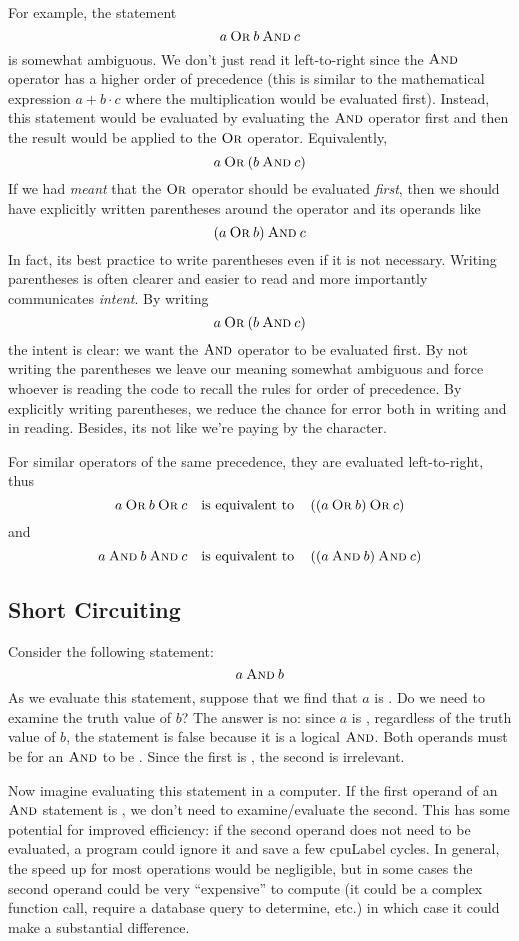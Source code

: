 For example, the statement
  $$a \mathbin{\textsc{Or}} b \mathbin{\textsc{And}} c$$
is somewhat ambiguous.  We don't just read it left-to-right since the $\mathbin{\textsc{And}}$ 
operator has a higher order of precedence (this is similar to the mathematical
expression $a + b \cdot c$ where the multiplication would be evaluated first).  
Instead, this statement would be evaluated by evaluating the $\mathbin{\textsc{And}}$ operator
first and then the result would be applied to the $\mathbin{\textsc{Or}}$ operator.  Equivalently, 
  $$a \mathbin{\textsc{Or}} (b \mathbin{\textsc{And}} c)$$
If we had \emph{meant} that the $\mathbin{\textsc{Or}}$ operator should be evaluated \emph{first}, 
then we should have explicitly written parentheses around the operator and
its operands like
  $$(a \mathbin{\textsc{Or}} b) \mathbin{\textsc{And}} c$$
In fact, its best practice to write parentheses even if it is not necessary.  Writing
parentheses is often clearer and easier to read and more importantly communicates
\emph{intent}.  By writing 
  $$a \mathbin{\textsc{Or}} (b \mathbin{\textsc{And}} c)$$
the intent is clear: we want the $\mathbin{\textsc{And}}$ operator to be evaluated first.  By not
writing the parentheses we leave our meaning somewhat ambiguous and force
whoever is reading the code to recall the rules for order of precedence.  By 
explicitly writing parentheses, we reduce the chance for error both in writing
and in reading.  Besides, its not like we're paying by the character.

For similar operators of the same precedence, they are evaluated left-to-right, thus
  $$a \mathbin{\textsc{Or}} b \mathbin{\textsc{Or}} c \quad \textrm{is equivalent to} \quad \left( (a \mathbin{\textsc{Or}} b) \mathbin{\textsc{Or}} c \right)$$
and 
  $$a \mathbin{\textsc{And}} b \mathbin{\textsc{And}} c \quad \textrm{is equivalent to} \quad \left( (a \mathbin{\textsc{And}} b) \mathbin{\textsc{And}} c \right)$$

\subsection{Short Circuiting}

Consider the following statement:
  $$a \mathbin{\textsc{And}} b$$
As we evaluate this statement, suppose that we find that $a$ is \False.  Do we need 
to examine the truth value of $b$?  The answer is no: since $a$ is \False, regardless 
of the truth value of $b$, the statement is false because it is a logical $\mathbin{\textsc{And}}$.  Both
operands must be \True for an $\mathbin{\textsc{And}}$ to be \True.  Since the first is \False, the second
is irrelevant.  

Now imagine evaluating this statement in a computer.  If the first operand of an $\mathbin{\textsc{And}}$
statement is \False, we don't need to examine/evaluate the second.  This has some
potential for improved efficiency: if the second operand does not need to be evaluated, 
a program could ignore it and save a few \gls{cpuLabel} cycles.  In general, the speed up
for most operations would be negligible, but in some cases the second operand could
be very ``expensive'' to compute (it could be a complex function call, require a database 
query to determine, etc.) in which case it could make a substantial difference.

